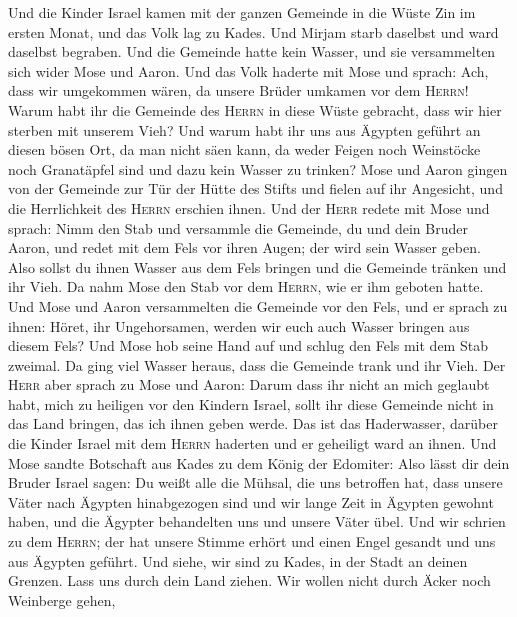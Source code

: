  Und die Kinder Israel kamen mit der ganzen Gemeinde in
die Wüste Zin im ersten Monat, und das Volk lag zu Kades. Und Mirjam
starb daselbst und ward daselbst begraben.  Und die
Gemeinde hatte kein Wasser, und sie versammelten sich wider Mose und
Aaron.  Und das Volk haderte mit Mose und sprach: Ach,
dass wir umgekommen wären, da unsere Brüder umkamen vor dem
\textsc{Herrn}!  Warum habt ihr die Gemeinde des
\textsc{Herrn} in diese Wüste gebracht, dass wir hier sterben mit
unserem Vieh?  Und warum habt ihr uns aus Ägypten geführt
an diesen bösen Ort, da man nicht säen kann, da weder Feigen noch
Weinstöcke noch Granatäpfel sind und dazu kein Wasser zu trinken?
 Mose und Aaron gingen von der Gemeinde zur Tür der Hütte
des Stifts und fielen auf ihr Angesicht, und die Herrlichkeit des
\textsc{Herrn} erschien ihnen.  Und der \textsc{Herr}
redete mit Mose und sprach:  Nimm den Stab und versammle
die Gemeinde, du und dein Bruder Aaron, und redet mit dem Fels vor ihren
Augen; der wird sein Wasser geben. Also sollst du ihnen Wasser aus dem
Fels bringen und die Gemeinde tränken und ihr Vieh.  Da
nahm Mose den Stab vor dem \textsc{Herrn}, wie er ihm geboten hatte.
 Und Mose und Aaron versammelten die Gemeinde vor den
Fels, und er sprach zu ihnen: Höret, ihr Ungehorsamen, werden wir euch
auch Wasser bringen aus diesem Fels?  Und Mose hob seine
Hand auf und schlug den Fels mit dem Stab zweimal. Da ging viel Wasser
heraus, dass die Gemeinde trank und ihr Vieh.  Der
\textsc{Herr} aber sprach zu Mose und Aaron: Darum dass ihr nicht an
mich geglaubt habt, mich zu heiligen vor den Kindern Israel, sollt ihr
diese Gemeinde nicht in das Land bringen, das ich ihnen geben werde.
 Das ist das Haderwasser, darüber die Kinder Israel mit
dem \textsc{Herrn} haderten und er geheiligt ward an ihnen.
 Und Mose sandte Botschaft aus Kades zu dem König der
Edomiter: Also lässt dir dein Bruder Israel sagen: Du weißt alle die
Mühsal, die uns betroffen hat,  dass unsere Väter nach
Ägypten hinabgezogen sind und wir lange Zeit in Ägypten gewohnt haben,
und die Ägypter behandelten uns und unsere Väter übel. 
Und wir schrien zu dem \textsc{Herrn}; der hat unsere Stimme erhört und
einen Engel gesandt und uns aus Ägypten geführt. Und siehe, wir sind zu
Kades, in der Stadt an deinen Grenzen.  Lass uns durch
dein Land ziehen. Wir wollen nicht durch Äcker noch Weinberge gehen,
